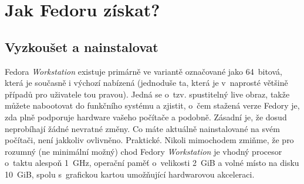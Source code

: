 \chapter*{Jak Fedoru získat?}

\section*{Vyzkoušet a nainstalovat}
 Fedora \emph{Workstation} existuje primárně ve variantě označované jako 64~bitová, která je současně i výchozí nabízená (jednoduše ta, která je v~naprosté většině případů pro uživatele tou pravou). Jedná se o~tzv. spustitelný live obraz, takže můžete nabootovat do funkčního systému a zjistit, o~čem stažená verze Fedory je, zda plně podporuje hardware vašeho počítače a podobně. Zásadní je, že dosud neprobíhají žádné nevratné změny. Co máte aktuálně nainstalované na svém počítači, není jakkoliv ovlivněno. Praktické. Nikoli mimochodem zmiňme, že pro rozumný (ne minimální možný) chod Fedory \emph{Workstation} je vhodný procesor o~taktu alespoň 1~GHz, operační paměť o~velikosti 2~GiB a volné místo na disku 10~GiB, spolu s~grafickou kartou umožňující hardwarovou akceleraci.

